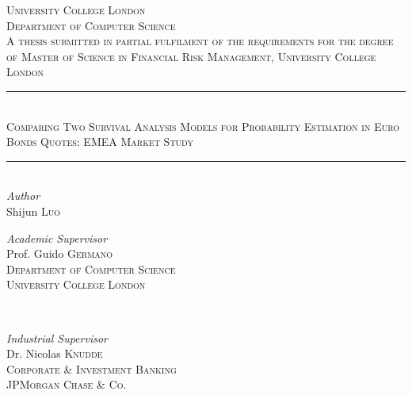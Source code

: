 \frontmatter
\begin{titlepage} %
\newcommand{\HRule}{\rule{\linewidth}{0.5mm}} %

\center %

\textsc{\LARGE University College London}\\[1.5cm] %

\textsc{\Large Department of Computer Science}\\[0.5cm] %

\textsc{\large A thesis submitted in partial fulfilment of the requirements for the degree of Master of Science in Financial Risk Management, University College London}\\[0.5cm] %

\HRule\\[0.4cm]
\textsc{\huge Comparing Two Survival Analysis Models for Probability Estimation in Euro Bonds Quotes: EMEA Market Study}\\[0.4cm] %
\HRule\\[1.5cm]

{\large\textit{Author}}\\
Shijun \textsc{Luo}
\vfill
\begin{minipage}{0.48\textwidth}
	\begin{flushleft}
		\large
		\textit{Academic Supervisor}\\
		Prof. Guido \textsc{Germano}\\
		\textsc{Department of Computer Science}\\
		\textsc{University College London}
	\end{flushleft}
\end{minipage}
~%
\begin{minipage}{0.48\textwidth}
	\begin{flushright}
		\large
		\textit{Industrial Supervisor}\\
		Dr. Nicolas \textsc{Knudde}\\
		\textsc{Corporate \& Investment Banking}\\%
		\textsc{JPMorgan Chase \& Co.}%
	\end{flushright}
\end{minipage}


\end{titlepage}
